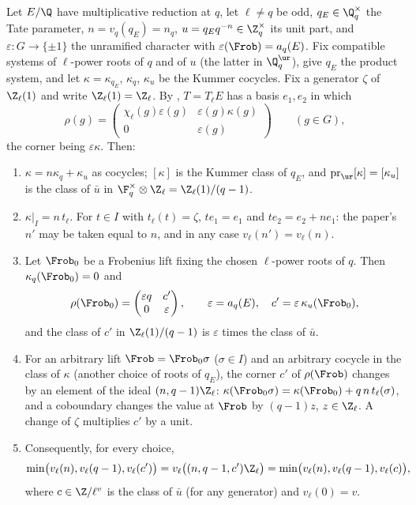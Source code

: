 \begin{theorem}\label{thm:galcoh:tate-kummer-class}
Let $E/\Q$ have multiplicative reduction at $q$, let $\ell\ne q$ be odd, $q_E\in\Q_q^\times$ the Tate parameter, $n=v_q(q_E)=n_q$, $u=q_Eq^{-n}\in\Z_q^\times$ its unit part,
and $\varepsilon\colon G\to\{\pm1\}$ the unramified character with $\varepsilon(\Frob)=a_q(E)$. Fix compatible systems of $\ell$-power roots of $q$ and of $u$ (the latter in
$\Q_q^{\ur}$), give $q_E$ the product system, and let $\kappa=\kappa_{q_E}$, $\kappa_q$, $\kappa_u$ be the Kummer cocycles. Fix a generator $\zeta$ of $\Z_\ell(1)$ and write
$\Z_\ell(1)=\Z_\ell$. By , $T=T_\ell E$ has a basis $e_1,e_2$ in which
\[
\rho(g)=\begin{pmatrix}\chi_\ell(g)\varepsilon(g)&\varepsilon(g)\kappa(g)\\0&\varepsilon(g)\end{pmatrix}\qquad(g\in G),
\]
the corner being $\varepsilon\kappa$. Then:
\begin{enumerate}[label=(\roman*)]
\item $\kappa=n\kappa_q+\kappa_u$ as cocycles; $[\kappa]$ is the Kummer class of $q_E$, and $\operatorname{pr}_{\ur}[\kappa]=[\kappa_u]$ is the class of $\bar u$ in
$\F_q^\times\otimes\Z_\ell=\Z_\ell(1)/(q-1)$.
\item $\kappa|_I=n\,t_\ell$. For $t\in I$ with $t_\ell(t)=\zeta$, $te_1=e_1$ and $te_2=e_2+ne_1$: the paper's $n'$ may be taken equal to $n$, and in any case $v_\ell(n')=v_\ell(n)$.
\item Let $\Frob_0$ be a Frobenius lift fixing the chosen $\ell$-power roots of $q$. Then $\kappa_q(\Frob_0)=0$ and
\[
\rho(\Frob_0)=\begin{pmatrix}\varepsilon q&c'\\0&\varepsilon\end{pmatrix},\qquad\varepsilon=a_q(E),\quad c'=\varepsilon\,\kappa_u(\Frob_0),
\]
and the class of $c'$ in $\Z_\ell(1)/(q-1)$ is $\varepsilon$ times the class of $\bar u$.
\item For an arbitrary lift $\Frob=\Frob_0\sigma$ ($\sigma\in I$) and an arbitrary cocycle in the class of $\kappa$ (another choice of roots of $q_E$), the corner $c'$ of $\rho(\Frob)$
changes by an element of the ideal $(n,q-1)\Z_\ell$: $\kappa(\Frob_0\sigma)=\kappa(\Frob_0)+q\,n\,t_\ell(\sigma)$, and a coboundary changes the value at $\Frob$ by $(q-1)z$,
$z\in\Z_\ell$. A change of $\zeta$ multiplies $c'$ by a unit.
\item Consequently, for every choice,
\[
\min\bigl(v_\ell(n),v_\ell(q-1),v_\ell(c')\bigr)=v_\ell\bigl((n,q-1,c')\Z_\ell\bigr)=\min\bigl(v_\ell(n),v_\ell(q-1),v_\ell(c)\bigr),
\]
where $c\in\Z/\ell^v$ is the class of $\bar u$ (for any generator) and $v_\ell(0)=v$.
\end{enumerate}
\end{theorem}

